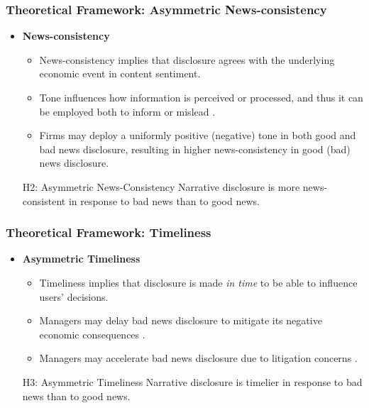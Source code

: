 \documentclass{beamer}
\begin{document}
\begin{frame}
	\frametitle{Theoretical Framework: Asymmetric News-consistency}
	\begin{itemize}
		\item \textbf{News-consistency}
		
		\begin{itemize}
			\item News-consistency implies that disclosure agrees with the underlying economic event in content sentiment. %
			\item Tone influences how information is perceived or processed, and thus it can be employed both to inform or mislead \citep{davisNumbersMeasuringInformation2012, liInformationContentForwardLooking2010, huangToneManagement2014}.
			\item Firms may deploy a uniformly positive (negative) tone in both good and bad news disclosure, resulting in higher news-consistency in good (bad) news disclosure.
		\end{itemize}
		
\medskip
\pause
\begin{block}{H2: Asymmetric News-Consistency}
	Narrative disclosure is more news-consistent in response to bad news than to good news.
\end{block}

		
	\end{itemize}
\end{frame}
\begin{frame}
	\frametitle{Theoretical Framework: Timeliness}
	\begin{itemize}
		\item \textbf{Asymmetric Timeliness}
		
		\begin{itemize}
			\item Timeliness implies that disclosure is made \textit{in time} to be able to influence users' decisions. 
			\item Managers may delay bad news disclosure to mitigate its negative economic consequences \citep{chambersTimelinessReportingStock1984, niessnerStrategicDisclosureTiming2015, segalAreManagersStrategic2016, brockbankStrategicTiming8K2018}.
			\item Managers may accelerate bad news disclosure due to litigation concerns \citep{skinnerWhyFirmsVoluntarily1994, marinovicNoNewsGood2016}.
		\end{itemize}
		
		
\medskip
\pause
\begin{block}{H3: Asymmetric Timeliness}
	Narrative disclosure is timelier in response to bad news than to good news.
\end{block}

		
	\end{itemize}
\end{frame}
\end{document}
